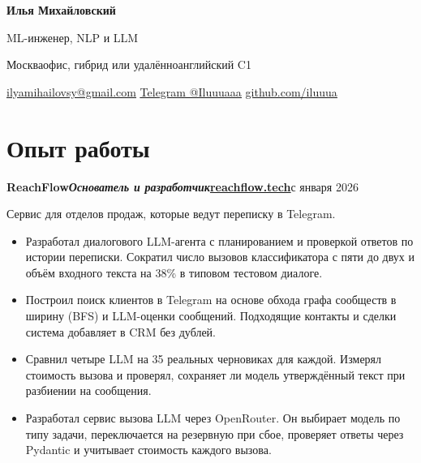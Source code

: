 \documentclass[10pt,a4paper]{article}
\newcommand{\role}[2]{\textbf{#1}\hfill{\small #2}\par}
\newcommand{\sep}{\enspace\textbar\enspace}
\begin{document}
\fontsize{10.3}{12.2}\selectfont
{\centering
  {\fontsize{23}{26}\selectfont\bfseries Илья Михайловский}\par
  \vspace{1.5pt}
  {\large ML-инженер, NLP и LLM}\par
  \vspace{2pt}
  Москва\sep офис, гибрид или удалённо\sep английский C1\par
  \href{mailto:ilyamihailovsy@gmail.com}{\underline{ilyamihailovsy@gmail.com}}\sep
  \href{https://t.me/Iluuuaaa}{\underline{Telegram @Iluuuaaa}}\sep
  \href{https://github.com/iluuua}{\underline{github.com/iluuua}}\par
}

\section{Опыт работы}
\role{ReachFlow\normalfont\enspace\textit{Основатель и разработчик}\enspace\href{https://reachflow.tech}{\underline{reachflow.tech}}}{с января 2026}
Сервис для отделов продаж, которые ведут переписку в Telegram.
\begin{itemize}
  \item Разработал диалогового LLM-агента с планированием и проверкой ответов по истории переписки. Сократил число вызовов классификатора с пяти до двух и объём входного текста на 38\% в типовом тестовом диалоге.
  \item Построил поиск клиентов в Telegram на основе обхода графа сообществ в ширину (BFS) и LLM-оценки сообщений. Подходящие контакты и сделки система добавляет в CRM без дублей.
  \item Сравнил четыре LLM на 35 реальных черновиках для каждой. Измерял стоимость вызова и проверял, сохраняет ли модель утверждённый текст при разбиении на сообщения.
  \item Разработал сервис вызова LLM через OpenRouter. Он выбирает модель по типу задачи, переключается на резервную при сбое, проверяет ответы через Pydantic и учитывает стоимость каждого вызова.
\end{itemize}
\end{document}
